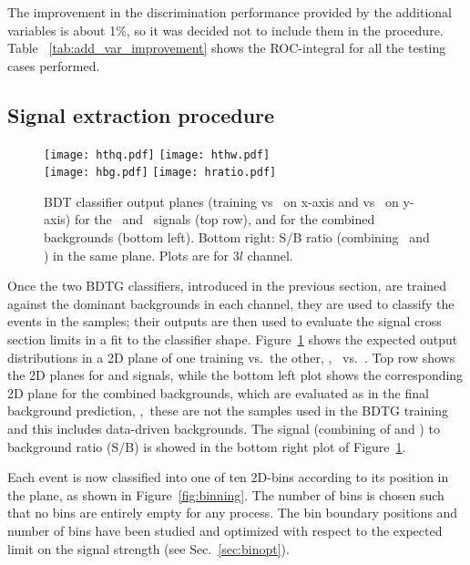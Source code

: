 The improvement in the discrimination performance provided by the additional variables is about 1\%, so it was decided not to include them in the procedure. Table ~\ref{tab:add_var_improvement} shows the ROC-integral for all the testing cases performed.

\subsection{Signal extraction procedure}

\begin{figure} [!h]
 \centering
 \texttt{[image: hthq.pdf]}
 \texttt{[image: hthw.pdf]}\\
 \texttt{[image: hbg.pdf]}
 \texttt{[image: hratio.pdf]}
\caption[2D BDT classifier output planes]{BDT classifier output planes (training vs \ttbar\ on x-axis and vs \ttV\ on y-axis) for the \tHq\ and \tHW\ signals (top row), and for the combined backgrounds (bottom left). Bottom right: S/B ratio (combining \tHq\ and \tHW) in the same plane. Plots are for $3l$ channel.}
\label{fig:mva12}
\end{figure}

Once the two BDTG classifiers, introduced in the previous section, are trained against the dominant backgrounds in each channel, they are used to classify the events in the samples; their outputs are then used to evaluate the signal cross section limits in a fit to the classifier shape. Figure~\ref{fig:mva12} shows the expected output distributions in a 2D plane of one training vs.\ the other, \ie, \ttV\ vs.\ \ttbar. Top row shows the 2D planes for \tHq and \tHW signals, while the bottom left plot shows the corresponding 2D plane for the combined backgrounds, which are evaluated as in the final background prediction, \ie,\ these are not the samples used in the BDTG training and this includes data-driven backgrounds. The signal (combining of \tHq and \tHW) to background ratio (S/B) is showed in the bottom right plot of Figure~\ref{fig:mva12}.      

Each event is now classified into one of ten 2D-bins according to its position in the plane, as shown in Figure~\ref{fig:binning}. The number of bins is chosen such that no bins are entirely empty for any process. The bin boundary positions and number of bins have been studied and optimized with respect to the expected limit on the signal strength (see Sec.~\ref{sec:binopt}).

